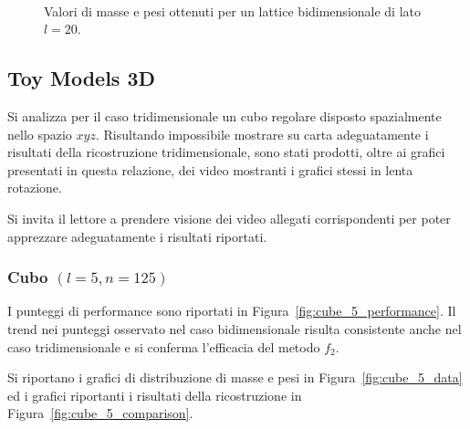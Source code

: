 \documentclass[10pt,a4paper]{article}
\begin{document}
\begin{figure}[p]
    \centering
    \\
    \caption{Valori di masse e pesi ottenuti per un lattice bidimensionale di lato \(l=20\).}\label{fig:lattice_20_data}
\end{figure}

\subsection{Toy Models 3D}

Si analizza per il caso tridimensionale un cubo regolare disposto spazialmente nello spazio \(xyz\).
Risultando impossibile mostrare su carta adeguatamente i risultati della ricostruzione tridimensionale, sono stati prodotti, oltre ai grafici presentati in questa relazione, dei video mostranti i grafici stessi in lenta rotazione.

Si invita il lettore a prendere visione dei video allegati corrispondenti per poter apprezzare adeguatamente i risultati riportati.

\subsubsection{Cubo \((l = 5, n = 125)\)}

I punteggi di performance sono riportati in Figura~\ref{fig:cube_5_performance}.
Il trend nei punteggi osservato nel caso bidimensionale risulta consistente anche nel caso tridimensionale e si conferma l'efficacia del metodo \(f_2\).

Si riportano i grafici di distribuzione di masse e pesi in Figura~\ref{fig:cube_5_data} ed i grafici riportanti i risultati della ricostruzione in Figura~\ref{fig:cube_5_comparison}.
\end{document}
